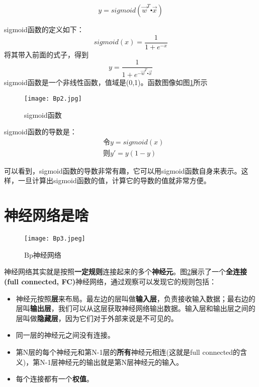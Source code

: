 \begin{equation}
	\label{eq:Bp1}
	y=sigmoid(\vec{w}^T\centerdot\vec{x})
\end{equation}


sigmoid函数的定义如下：
\[
	sigmoid(x)=\frac{1}{1+e^{-x}}
\]
将其带入前面的式子，得到
\[
	y=\frac{1}{1+e^{-\vec{w}^T\centerdot\vec{x}}}
\]
sigmoid函数是一个非线性函数，值域是(0,1)。函数图像如图\ref{fig:Bp2}所示

\begin{figure}[htbp]
	\centering
	\texttt{[image: Bp2.jpg]}
	\caption{sigmoid函数}
	\label{fig:Bp2}
\end{figure}

sigmoid函数的导数是：
\begin{align*}
	 & \mbox{令} y=sigmoid(x) \\
	 & \mbox{则} y'=y(1-y)
\end{align*}


可以看到，sigmoid函数的导数非常有趣，它可以用sigmoid函数自身来表示。这样，一旦计算出sigmoid函数的值，计算它的导数的值就非常方便。


\section{神经网络是啥}\label{Bp:2}

\begin{figure}[htbp]
	\centering
	\texttt{[image: Bp3.jpeg]}
	\caption{Bp神经网络}
	\label{fig:Bp3}
\end{figure}

神经网络其实就是按照\textbf{一定规则}连接起来的多个\textbf{神经元}。图\ref{fig:Bp3}展示了一个\textbf{全连接(full connected, FC)}神经网络，通过观察可以发现它的规则包括：

\begin{itemize}
	\item
	      神经元按照\textbf{层}来布局。最左边的层叫做\textbf{输入层}，负责接收输入数据；最右边的层叫\textbf{输出层}，我们可以从这层获取神经网络输出数据。输入层和输出层之间的层叫做\textbf{隐藏层}，因为它们对于外部来说是不可见的。
	\item
	      同一层的神经元之间没有连接。
	\item
	      第N层的每个神经元和第N-1层的\textbf{所有}神经元相连(这就是full connected的含义)，第N-1层神经元的输出就是第N层神经元的输入。
	\item
	      每个连接都有一个\textbf{权值}。
\end{itemize}


